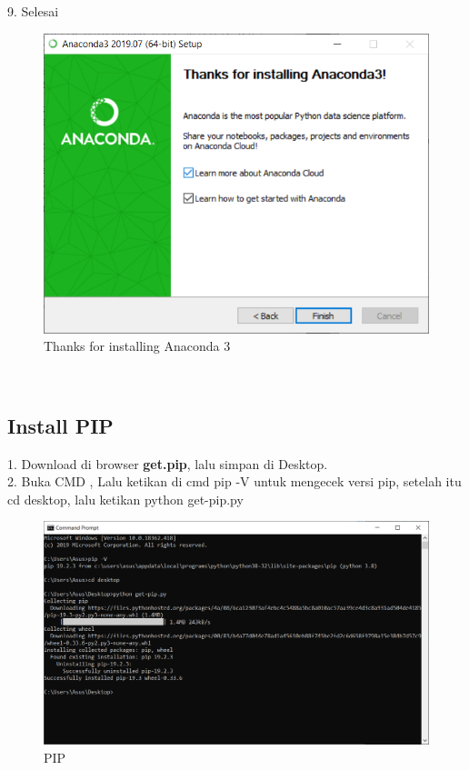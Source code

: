 \documentclass[12pt, times new roman, a4paper]{article}
\begin{document}
\\
\\
\\
\\
\\
\\
\\
\\
\\
\\
9. Selesai\\
\begin{figure}[h]
	\centering
		\includegraphics[scale=0.5]{Gambar/A9}
	\caption{Thanks for installing Anaconda 3}
\end{figure}
\\
\subsection{Install PIP}
1. Download di browser \textbf{get.pip}, lalu simpan di Desktop.\\
2. Buka CMD , Lalu ketikan di cmd pip -V untuk mengecek versi pip, setelah itu cd desktop, lalu ketikan python get-pip.py\\
\begin{figure}[h]
	\centering
		\includegraphics[scale=0.5]{Gambar/C1}
		\caption{PIP}
\end{figure}
\\
\end{document}
